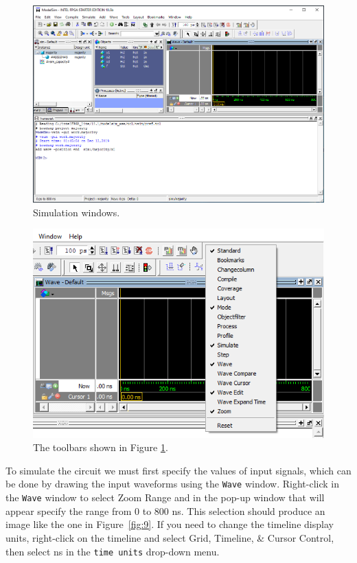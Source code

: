 \documentclass[11pt, twoside, pdftex]{article}
\begin{document}
\begin{figure}[H]
   \begin{center}
      \includegraphics[width=\textwidth]{figures/sim_mode.png}
   \caption{Simulation windows.} 
	 \label{fig:8}
	 \end{center}
\end{figure}

\begin{figure}[H]
   \begin{center}
      \includegraphics[scale=1.50]{figures/toolbar.png}
       \caption{The toolbars shown in Figure \ref{fig:8}.} 
	 \label{fig:toolbars}
	 \end{center}
\end{figure}

To simulate the circuit we must first specify the values of input signals, which can be done 
by drawing the input waveforms using the \texttt{Wave} window. Right-click in the \texttt{Wave}
window to select {\sf Zoom Range} and in the pop-up window that will appear specify the range 
from 0 to 800 ns. This selection should produce an image like the one in Figure~\ref{fig:9}.
If you need to change the timeline display units, right-click on the timeline and select 
{\sf Grid, Timeline, \& Cursor Control}, then select 
{\sf ns} in the \texttt{time units} drop-down menu.
\end{document}
